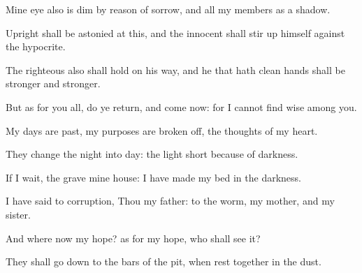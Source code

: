 {Mine
eye also is
dim by reason of
sorrow, and all my
members
{} as a
shadow.

Upright
{} shall be
astonied at this, and the
innocent shall stir
up himself against the
hypocrite.

The
righteous also shall
hold on his
way, and he that hath
clean
hands shall
be stronger and
stronger.


\par }{\PP {}But as for you all, do ye
return, and come
now: for I cannot
find
{}
wise
{} among you.

My
days are
past, my
purposes are broken
off,
{} the
thoughts of my
heart.

They
change the
night into
day: the
light
{}
short
because of
darkness.

If I
wait, the
grave
{} mine
house: I have
made my
bed in the
darkness.

I have
said to
corruption, Thou
{} my
father: to the
worm,
{} my
mother, and my
sister.

And where
{}
now my
hope? as for my
hope, who shall
see it?

They shall go
down to the
bars of the
pit, when
{}
rest
together
{} in the
dust.




\par }
